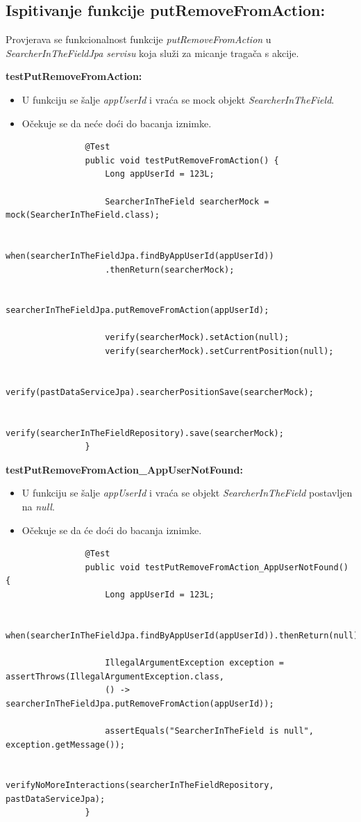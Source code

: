 			\subsection{Ispitivanje funkcije putRemoveFromAction:}
			Provjerava se funkcionalnost funkcije \textit{putRemoveFromAction} u \textit{SearcherInTheFieldJpa servisu} koja služi za micanje tragača s akcije.
			
			\textbf{testPutRemoveFromAction:}
			\begin{itemize}
				\item U funkciju se šalje \textit{appUserId} i vraća se mock objekt \textit{SearcherInTheField}.
				\item Očekuje se da neće doći do bacanja iznimke.
			\end{itemize}
			\begin{lstlisting}
				@Test
				public void testPutRemoveFromAction() {
					Long appUserId = 123L;
					
					SearcherInTheField searcherMock = mock(SearcherInTheField.class);
					
					when(searcherInTheFieldJpa.findByAppUserId(appUserId))
					.thenReturn(searcherMock);
					
					searcherInTheFieldJpa.putRemoveFromAction(appUserId);
					
					verify(searcherMock).setAction(null);
					verify(searcherMock).setCurrentPosition(null);
					
					verify(pastDataServiceJpa).searcherPositionSave(searcherMock);
					
					verify(searcherInTheFieldRepository).save(searcherMock);
				}
			\end{lstlisting}
			
			\textbf{testPutRemoveFromAction\_AppUserNotFound:}
			\begin{itemize}
				\item U funkciju se šalje \textit{appUserId} i vraća se objekt \textit{SearcherInTheField} postavljen na \textit{null}.
				\item Očekuje se da će doći do bacanja iznimke.
			\end{itemize}
			\begin{lstlisting}
				@Test
				public void testPutRemoveFromAction_AppUserNotFound() {
					Long appUserId = 123L;
					
					when(searcherInTheFieldJpa.findByAppUserId(appUserId)).thenReturn(null);
					
					IllegalArgumentException exception = assertThrows(IllegalArgumentException.class,
					() -> searcherInTheFieldJpa.putRemoveFromAction(appUserId));
					
					assertEquals("SearcherInTheField is null", exception.getMessage());
					
					verifyNoMoreInteractions(searcherInTheFieldRepository, pastDataServiceJpa);
				}
			\end{lstlisting}
			
